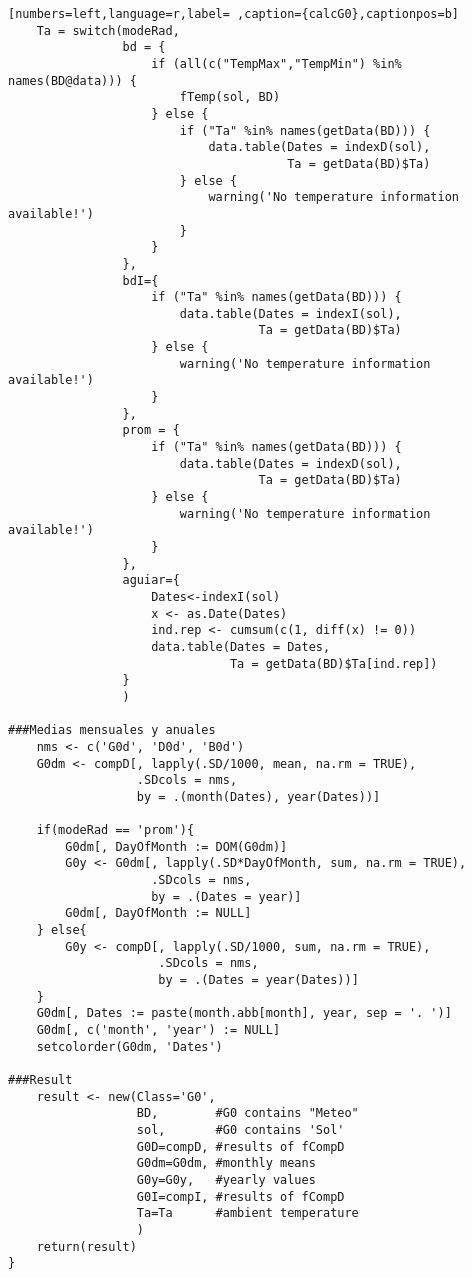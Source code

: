 \begin{lstlisting}[numbers=left,language=r,label= ,caption={calcG0},captionpos=b]
    Ta = switch(modeRad,
                bd = {
                    if (all(c("TempMax","TempMin") %in% names(BD@data))) {
                        fTemp(sol, BD)
                    } else {
                        if ("Ta" %in% names(getData(BD))) {
                            data.table(Dates = indexD(sol),
                                       Ta = getData(BD)$Ta)
                        } else {
                            warning('No temperature information available!')
                        }
                    }
                },
                bdI={
                    if ("Ta" %in% names(getData(BD))) {
                        data.table(Dates = indexI(sol),
                                   Ta = getData(BD)$Ta)
                    } else {
                        warning('No temperature information available!')
                    }
                },
                prom = {
                    if ("Ta" %in% names(getData(BD))) {
                        data.table(Dates = indexD(sol),
                                   Ta = getData(BD)$Ta)
                    } else {
                        warning('No temperature information available!')
                    }                  
                },
                aguiar={
                    Dates<-indexI(sol)	
                    x <- as.Date(Dates)
                    ind.rep <- cumsum(c(1, diff(x) != 0))
                    data.table(Dates = Dates,
                               Ta = getData(BD)$Ta[ind.rep])
                }
                )

###Medias mensuales y anuales
    nms <- c('G0d', 'D0d', 'B0d')
    G0dm <- compD[, lapply(.SD/1000, mean, na.rm = TRUE),
                  .SDcols = nms,
                  by = .(month(Dates), year(Dates))]

    if(modeRad == 'prom'){
        G0dm[, DayOfMonth := DOM(G0dm)]
        G0y <- G0dm[, lapply(.SD*DayOfMonth, sum, na.rm = TRUE),
                    .SDcols = nms,
                    by = .(Dates = year)]
        G0dm[, DayOfMonth := NULL]        
    } else{
        G0y <- compD[, lapply(.SD/1000, sum, na.rm = TRUE),
                     .SDcols = nms,
                     by = .(Dates = year(Dates))]
    }
    G0dm[, Dates := paste(month.abb[month], year, sep = '. ')]
    G0dm[, c('month', 'year') := NULL]
    setcolorder(G0dm, 'Dates')

###Result
    result <- new(Class='G0',
                  BD,        #G0 contains "Meteo"
                  sol,       #G0 contains 'Sol'
                  G0D=compD, #results of fCompD
                  G0dm=G0dm, #monthly means
                  G0y=G0y,   #yearly values
                  G0I=compI, #results of fCompD
                  Ta=Ta      #ambient temperature
                  )
    return(result)
}
\end{lstlisting}
